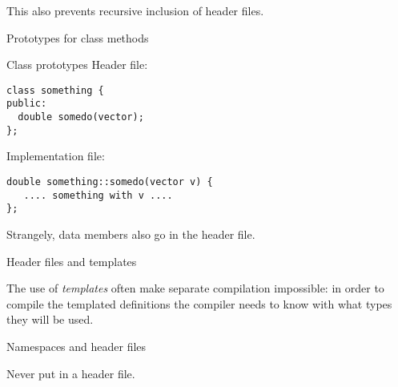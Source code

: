 This also prevents recursive inclusion of header files.

 {Prototypes for class methods}

\begin{block}{Class prototypes}
  \label{sl:class-proto}
  Header file:
\begin{verbatim}
class something {
public:
  double somedo(vector);
};
\end{verbatim}

Implementation file:
\begin{verbatim}
double something::somedo(vector v) {
   .... something with v ....
};
\end{verbatim}
Strangely, data members also go in the header file.
\end{block}

 {Header files and templates}

The use of \emph{templates}
often make separate compilation impossible: in order to compile the
templated definitions the compiler needs to know with what types they
will be used.

 {Namespaces and header files}

Never put  in a header file.
